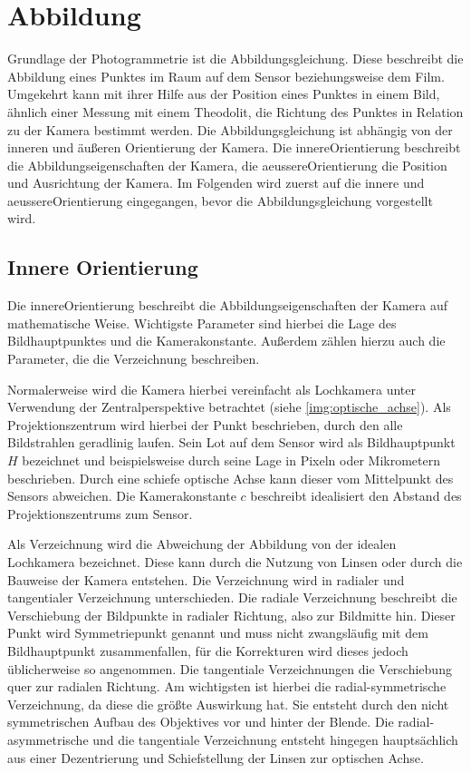 \documentclass[./00PhotoBox.tex]{subfiles}
\begin{document}
\section{Abbildung}
\label{s:abbildung}
Grundlage der Photogrammetrie ist die Abbildungsgleichung. Diese beschreibt die Abbildung eines Punktes im Raum auf dem Sensor beziehungsweise dem Film. Umgekehrt kann mit ihrer Hilfe aus der Position eines Punktes in einem Bild, ähnlich einer Messung mit einem Theodolit, die Richtung des Punktes in Relation zu der Kamera bestimmt werden. Die Abbildungsgleichung ist abhängig von der inneren und äußeren Orientierung der Kamera. Die \gls{innereOrientierung} beschreibt die Abbildungseigenschaften der Kamera, die \gls{aeussereOrientierung} die Position und Ausrichtung der Kamera. Im Folgenden wird zuerst auf die innere und \gls{aeussereOrientierung} eingegangen, bevor die Abbildungsgleichung vorgestellt wird.

\subsection{Innere Orientierung}
\label{s:innereorientierung}
Die \gls{innereOrientierung} beschreibt die Abbildungseigenschaften der Kamera auf mathematische Weise. Wichtigste Parameter sind hierbei die Lage des \Gls{Bildhauptpunkt}es und die Kamerakonstante. Außerdem zählen hierzu auch die Parameter, die die \Gls{Verzeichnung} beschreiben. \citep[S. 179f]{luhmann}

Normalerweise wird die Kamera hierbei vereinfacht als Lochkamera unter Verwendung der Zentralperspektive betrachtet (siehe \autoref{img:optische_achse}). Als Projektionszentrum wird hierbei der Punkt beschrieben, durch den alle Bildstrahlen geradlinig laufen. Sein Lot auf dem Sensor wird als \Gls{Bildhauptpunkt} $H$ bezeichnet und beispielsweise durch seine Lage in Pixeln oder Mikrometern beschrieben. Durch eine schiefe optische Achse kann dieser vom Mittelpunkt des Sensors abweichen. Die \Gls{Kamerakonstante} $c$ beschreibt idealisiert den Abstand des Projektionszentrums zum Sensor. \citep[S. 177]{luhmann}

Als \Gls{Verzeichnung} wird die Abweichung der Abbildung von der idealen Lochkamera bezeichnet. Diese kann durch die Nutzung von Linsen oder durch die Bauweise der Kamera entstehen. Die \Gls{Verzeichnung} wird in radialer und tangentialer \Gls{Verzeichnung} unterschieden. Die radiale \Gls{Verzeichnung} beschreibt die Verschiebung der Bildpunkte in radialer Richtung, also zur Bildmitte hin. Dieser Punkt wird Symmetriepunkt genannt und muss nicht zwangsläufig mit dem Bildhauptpunkt zusammenfallen, für die Korrekturen wird dieses jedoch üblicherweise so angenommen. Die tangentiale \Gls{Verzeichnung}en die Verschiebung quer zur radialen Richtung. Am wichtigsten ist hierbei die radial-symmetrische \Gls{Verzeichnung}, da diese die größte Auswirkung hat. Sie entsteht durch den nicht symmetrischen Aufbau des Objektives vor und hinter der Blende. Die radial-asymmetrische und die tangentiale \Gls{Verzeichnung} entsteht hingegen hauptsächlich aus einer Dezentrierung und Schiefstellung der Linsen zur optischen Achse. \citep[S. 178]{luhmann}
\end{document}
